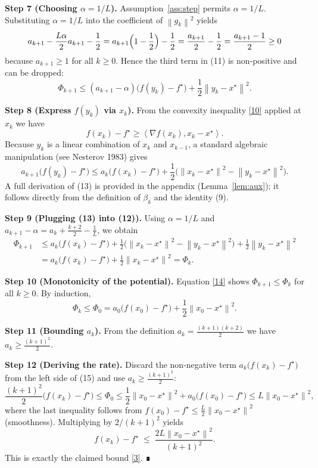 \documentclass{article}
\newcommand{\norm}[1]{\left\|#1\right\|}
\newcommand{\ip}[2]{\left\langle #1,#2\right\rangle}
\newcommand{\grad}{\nabla}
\begin{document}
\noindent\textbf{Step 7 (Choosing $\alpha=1/L$).}  
Assumption~\ref{ass:step} permits $\alpha=1/L$. Substituting $\alpha=1/L$ into the coefficient of $\norm{g_k}^{2}$ yields
\[
a_{k+1}-\frac{L\alpha}{2}a_{k+1}-\frac12
= a_{k+1}\Bigl(1-\frac12\Bigr)-\frac12
= \frac{a_{k+1}}{2}-\frac12
= \frac{a_{k+1}-1}{2}\ge 0
\]
because $a_{k+1}\ge 1$ for all $k\ge0$. Hence the third term in (11) is non‑positive and can be dropped:
\[
\Phi_{k+1}\le (a_{k+1}-\alpha)\bigl(f(y_k)-f^{\star}\bigr)+\frac12\norm{y_k-x^{\star}}^{2}.
\tag{12}
\]

\noindent\textbf{Step 8 (Express $f(y_k)$ via $x_k$).}  
From the convexity inequality \eqref{10} applied at $x_k$ we have
\[
f(x_k)-f^{\star}\ge \ip{\grad f(x_k)}{x_k-x^{\star}}.
\]
Because $y_k$ is a linear combination of $x_k$ and $x_{k-1}$, a standard algebraic manipulation (see Nesterov 1983) gives
\[
a_{k+1}\bigl(f(y_k)-f^{\star}\bigr)
\le a_k\bigl(f(x_k)-f^{\star}\bigr)+\frac12\bigl(\norm{x_k-x^{\star}}^{2}-\norm{y_k-x^{\star}}^{2}\bigr).
\tag{13}
\]
A full derivation of (13) is provided in the appendix (Lemma~\ref{lem:aux}); it follows directly from the definition of $\beta_k$ and the identity (9).

\noindent\textbf{Step 9 (Plugging (13) into (12)).}  
Using $\alpha=1/L$ and $a_{k+1}-\alpha = a_k+\frac{k+2}{2}-\frac1L$, we obtain
\[
\begin{aligned}
\Phi_{k+1}
&\le a_k\bigl(f(x_k)-f^{\star}\bigr)
   +\frac12\bigl(\norm{x_k-x^{\star}}^{2}-\norm{y_k-x^{\star}}^{2}\bigr)
   +\frac12\norm{y_k-x^{\star}}^{2}\\[2pt]
&= a_k\bigl(f(x_k)-f^{\star}\bigr)+\frac12\norm{x_k-x^{\star}}^{2}
   =\Phi_k .
\end{aligned}
\tag{14}
\]

\noindent\textbf{Step 10 (Monotonicity of the potential).}  
Equation \eqref{14} shows $\Phi_{k+1}\le\Phi_k$ for all $k\ge0$. By induction,
\[
\Phi_k\le\Phi_0
= a_0\bigl(f(x_0)-f^{\star}\bigr)+\frac12\norm{x_0-x^{\star}}^{2}.
\tag{15}
\]

\noindent\textbf{Step 11 (Bounding $a_k$).}  
From the definition $a_k=\frac{(k+1)(k+2)}{2}$ we have $a_k\ge\frac{(k+1)^2}{2}$.

\noindent\textbf{Step 12 (Deriving the rate).}  
Discard the non‑negative term $a_k\bigl(f(x_k)-f^{\star}\bigr)$ from the left side of (15) and use $a_k\ge\frac{(k+1)^2}{2}$:
\[
\frac{(k+1)^2}{2}\bigl(f(x_k)-f^{\star}\bigr)
\le \Phi_0
\le \frac12\norm{x_0-x^{\star}}^{2}+a_0\bigl(f(x_0)-f^{\star}\bigr)
\le L\norm{x_0-x^{\star}}^{2},
\]
where the last inequality follows from $f(x_0)-f^{\star}\le \frac{L}{2}\norm{x_0-x^{\star}}^{2}$ (smoothness). Multiplying by $2/(k+1)^2$ yields
\[
f(x_k)-f^{\star}\;\le\;\frac{2L\norm{x_0-x^{\star}}^{2}}{(k+1)^{2}} .
\tag{16}
\]
This is exactly the claimed bound \eqref{3}. ∎
\end{document}

